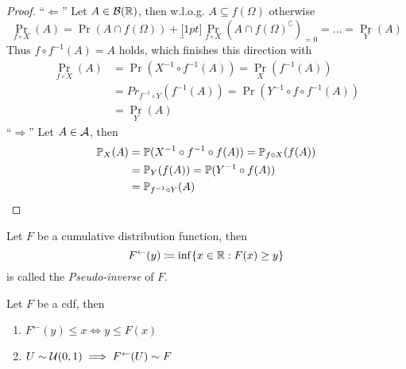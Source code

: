 \begin{proof}
    ``\(\Leftarrow\)'' Let \(A\in\cB(\R)\), then w.l.o.g. \(A\subseteq f(\Omega)\) otherwise
    \[
        \Pr_{f\circ X}(A)=\Pr(A\cap f(\Omega))+\underbracket[1pt]{
            \Pr_{f\circ X}(A\cap f(\Omega)^\complement)
            }_{=0}=\dotsc=\Pr_Y(A) 
    \]
    Thus \(f\circ f^{-1}(A)=A\) holds, which finishes this direction with
    \begin{align*}
        \Pr_{f\circ X}(A)
        &=\Pr(X^{-1}\circ f^{-1}(A))=\Pr_X(f^{-1}(A))\\
        &=Pr_{f^{-1}\circ Y}(f^{-1}(A))=\Pr(Y^{-1}\circ f\circ f^{-1}(A))\\
        &=\Pr_Y(A)
    \end{align*}
    ``\(\Rightarrow\)'' Let \(A\in\cA\), then
    \begin{align*}
        \Pr_X(A)&=\Pr(X^{-1}\circ f^{-1}\circ f(A))=\Pr_{f\circ X}(f(A))\\
        &=\Pr_Y(f(A))=\Pr(Y^{-1}\circ f(A))\\
        &=\Pr_{f^{-1}\circ Y}(A) \qedhere
    \end{align*}
\end{proof}
\begin{definition}\label{appx3}
    Let \(F\) be a cumulative distribution function, then 
    \[F^\leftarrow (y) \coloneqq \inf\{x\in\R : F(x)\ge y \}\]
    is called the \emph{Pseudo-inverse} of \(F\).
\end{definition}
\begin{lemma}
    Let \(F\) be a cdf, then
    \begin{enumerate}[label=(\roman*), font=\normalfont]
        \item\label{appx3:i} \(
            F^\leftarrow (y)\le x \iff y \le F(x)
        \)
        \item\label{appx3:ii} \(U\sim\cU(0,1) \implies F^\leftarrow(U) \sim F \)
    \end{enumerate}
\end{lemma}
